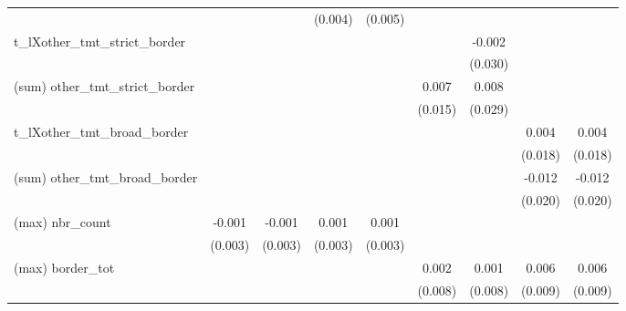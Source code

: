 {\begin{tabular}{l*{8}{c}}
                &                  &                  &  (0.004)         &  (0.005)         &                  &                  &                  &                  \\
t\_lXother\_tmt\_strict\_border&                  &                  &                  &                  &                  &   -0.002         &                  &                  \\
                &                  &                  &                  &                  &                  &  (0.030)         &                  &                  \\
(sum) other\_tmt\_strict\_border&                  &                  &                  &                  &    0.007         &    0.008         &                  &                  \\
                &                  &                  &                  &                  &  (0.015)         &  (0.029)         &                  &                  \\
t\_lXother\_tmt\_broad\_border&                  &                  &                  &                  &                  &                  &    0.004         &    0.004         \\
                &                  &                  &                  &                  &                  &                  &  (0.018)         &  (0.018)         \\
(sum) other\_tmt\_broad\_border&                  &                  &                  &                  &                  &                  &   -0.012         &   -0.012         \\
                &                  &                  &                  &                  &                  &                  &  (0.020)         &  (0.020)         \\
(max) nbr\_count &   -0.001         &   -0.001         &    0.001         &    0.001         &                  &                  &                  &                  \\
                &  (0.003)         &  (0.003)         &  (0.003)         &  (0.003)         &                  &                  &                  &                  \\
(max) border\_tot&                  &                  &                  &                  &    0.002         &    0.001         &    0.006         &    0.006         \\
                &                  &                  &                  &                  &  (0.008)         &  (0.008)         &  (0.009)         &  (0.009)         \\

\end{tabular}}
